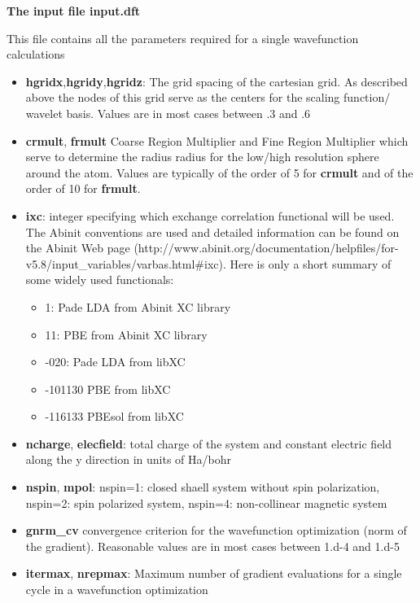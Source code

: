 \documentclass[a4paper,11pt]{report}
\begin{document}
\pagebreak
\begin{center} \large
{ \bf The input file input.dft}
\end{center}
This file contains all the parameters required for a single wavefunction calculations
\begin{itemize}
\item {\bf hgridx},{\bf hgridy},{\bf hgridz}: The grid spacing of the cartesian grid. As 
        described above the nodes of this grid serve as the centers for the scaling function/ wavelet basis. 
       Values are in most cases between .3 and .6

\item {\bf crmult}, {\bf frmult} Coarse Region Multiplier and Fine Region Multiplier which serve to determine the radius
      radius for the low/high resolution sphere around the atom. 
      Values are typically of the order of 5 for {\bf crmult} and of the order of 10 for  {\bf frmult}.
\item {\bf ixc}: integer specifying which exchange correlation functional will be used. The Abinit conventions are 
      used and detailed information can be found on the Abinit Web page 
      (http://www.abinit.org/documentation/helpfiles/for-v5.8/input\_variables/varbas.html\#ixc). 
       Here is only a short summary of some widely used functionals:
      \begin{itemize}
      \item  1: Pade LDA from Abinit XC library
      \item  11: PBE from Abinit XC library
      \item -020: Pade LDA from libXC
      \item -101130  PBE from  libXC
      \item -116133 PBEsol from libXC
      \end{itemize}
\item {\bf ncharge}, {\bf elecfield}: total charge of the system and constant electric field along the y direction in units of Ha/bohr
\item {\bf nspin}, {\bf mpol}: nspin=1: closed shaell system without spin polarization, nspin=2: spin polarized 
      system, nspin=4: non-collinear magnetic system
\item {\bf gnrm\_cv} convergence criterion for the wavefunction optimization (norm of the gradient).
      Reasonable values are in most cases between 1.d-4 and 1.d-5
\item {\bf itermax}, {\bf nrepmax}: Maximum number of gradient evaluations for a single cycle in a wavefunction optimization 

\end{itemize}
\end{document}
